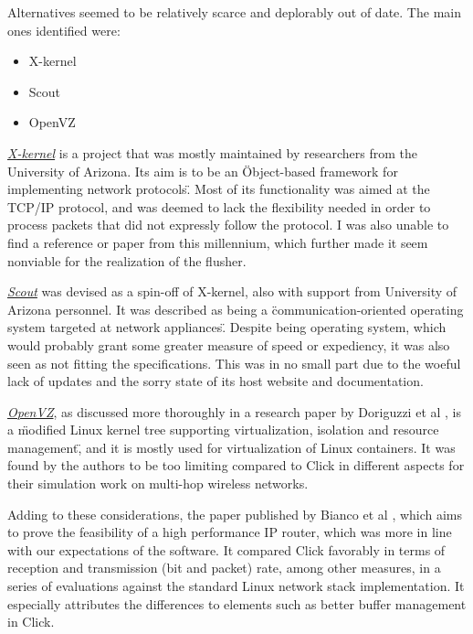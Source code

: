 Alternatives seemed to be relatively scarce and deplorably out of date. The main ones identified were:
\begin{itemize}
\item X-kernel
\item Scout
\item OpenVZ
\end{itemize}

\href{http://www.cs.arizona.edu/projects/xkernel/}{\textit{X-kernel}} is a project that was mostly maintained by researchers from the University of Arizona. Its aim is to be an \"Object-based framework for implementing network protocols\". Most of its functionality was aimed at the TCP/IP protocol, and was deemed to lack the flexibility needed in order to process packets that did not expressly follow the protocol. I was also unable to find a reference or paper from this millennium, which further made it seem nonviable for the realization of the flusher.

\href{http://www.cs.arizona.edu/projects/scout/}{\textit{Scout}} was devised as a spin-off of X-kernel, also with support from University of Arizona personnel. It was described as being  a \"communication-oriented operating system targeted at network appliances\". Despite being operating system, which would probably grant some greater measure of speed or expediency, it was also seen as not fitting the specifications. This was in no small part due to the woeful lack of updates and the sorry state of its host website and documentation.

\href{https://openvz.org/}{\textit{OpenVZ}}, as discussed more thoroughly in a research paper by Doriguzzi et al \cite{DoriguzziCorin2011}, is a \"modified Linux kernel tree supporting virtualization, isolation and resource management\", and it is mostly used for virtualization of Linux containers. It was found by the authors to be too limiting compared to Click in different aspects for their simulation work on multi-hop wireless networks.

Adding to these considerations, the paper published by Bianco et al \cite{Bianco2005}, which aims to prove the feasibility of a high performance IP router, which was more in line with our expectations of the software. It compared Click favorably in terms of reception and transmission (bit and packet) rate, among other measures, in a series of evaluations against the standard Linux network stack implementation. It especially attributes the differences to elements such as better buffer management in Click.

